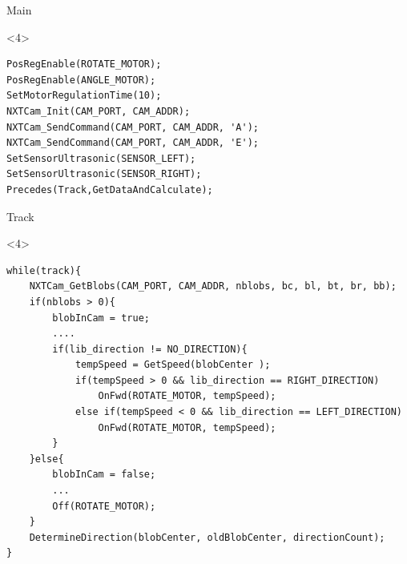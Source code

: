\begin{frame}[fragile]{Main}
\begin{onlyenv}<4>
\begin{center}
\begin{minipage}[H]{0.9\linewidth}
\begin{lstlisting}
PosRegEnable(ROTATE_MOTOR);
PosRegEnable(ANGLE_MOTOR);
SetMotorRegulationTime(10);
NXTCam_Init(CAM_PORT, CAM_ADDR);
NXTCam_SendCommand(CAM_PORT, CAM_ADDR, 'A'); 
NXTCam_SendCommand(CAM_PORT, CAM_ADDR, 'E');
SetSensorUltrasonic(SENSOR_LEFT);
SetSensorUltrasonic(SENSOR_RIGHT);
Precedes(Track,GetDataAndCalculate);
\end{lstlisting} 
\end{minipage}
\end{center}
\end{onlyenv}
\end{frame}

\begin{frame}[fragile]{Track}
\begin{onlyenv}<4>
\begin{center}
\begin{minipage}[H]{0.9\linewidth}
\begin{lstlisting}
while(track){
	NXTCam_GetBlobs(CAM_PORT, CAM_ADDR, nblobs, bc, bl, bt, br, bb);
    if(nblobs > 0){
    	blobInCam = true;
        ....
        if(lib_direction != NO_DIRECTION){
        	tempSpeed = GetSpeed(blobCenter );
            if(tempSpeed > 0 && lib_direction == RIGHT_DIRECTION)
            	OnFwd(ROTATE_MOTOR, tempSpeed);
            else if(tempSpeed < 0 && lib_direction == LEFT_DIRECTION)
            	OnFwd(ROTATE_MOTOR, tempSpeed);
        }
	}else{
    	blobInCam = false;
        ...
    	Off(ROTATE_MOTOR);
	}
    DetermineDirection(blobCenter, oldBlobCenter, directionCount);
}
\end{lstlisting} 
\end{minipage}
\end{center}
\end{onlyenv}
\end{frame}

